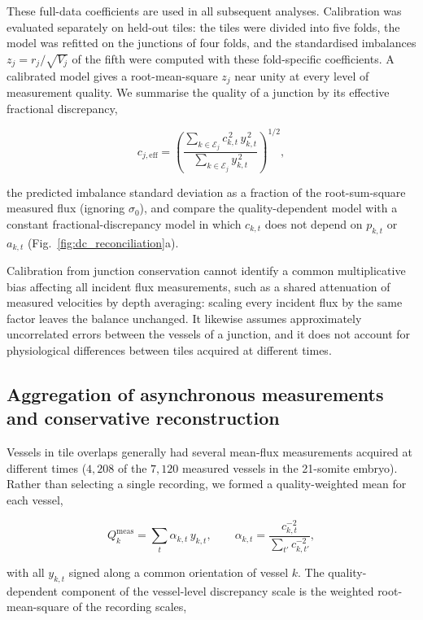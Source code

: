 These full-data coefficients are used in all subsequent analyses. Calibration was evaluated separately on held-out
tiles: the tiles were divided into five folds, the model was refitted on the junctions of four folds, and the
standardised imbalances $z_j=r_j/\sqrt{V_j}$ of the fifth were computed with these fold-specific coefficients. A calibrated
model gives a root-mean-square $z_j$ near unity at every level of measurement quality. We summarise the quality of a
junction by its effective fractional discrepancy,

\begin{equation}
c_{j,\mathrm{eff}}
=
\left(
\frac{\sum_{k\in\mathcal E_j}c_{k,t}^{\,2}\,y_{k,t}^{\,2}}
{\sum_{k\in\mathcal E_j}y_{k,t}^{\,2}}
\right)^{1/2},
\end{equation}

the predicted imbalance standard deviation as a fraction of the root-sum-square measured flux (ignoring $\sigma_0$), and
compare the quality-dependent model with a constant fractional-discrepancy model in which $c_{k,t}$ does not depend on
$p_{k,t}$ or $a_{k,t}$ (Fig.~\ref{fig:dc_reconciliation}a).

Calibration from junction conservation cannot identify a common multiplicative bias affecting all incident flux
measurements, such as a shared attenuation of measured velocities by depth averaging: scaling every incident flux by the
same factor leaves the balance unchanged. It likewise assumes approximately uncorrelated errors between the vessels of a
junction, and it does not account for physiological differences between tiles acquired at different times.

\subsection*{Aggregation of asynchronous measurements and conservative reconstruction}

Vessels in tile overlaps generally had several mean-flux measurements acquired at different times ($4{,}208$ of the
$7{,}120$ measured vessels in the 21-somite embryo). Rather than selecting a single recording, we formed a
quality-weighted mean for each vessel,

\begin{equation}
Q_k^{\mathrm{meas}}
=
\sum_t \alpha_{k,t}\,y_{k,t},
\qquad
\alpha_{k,t}=\frac{c_{k,t}^{-2}}{\sum_{t'}c_{k,t'}^{-2}},
\label{eq:measurement_aggregation}
\end{equation}

with all $y_{k,t}$ signed along a common orientation of vessel $k$. The quality-dependent component of the vessel-level
discrepancy scale is the weighted root-mean-square of the recording scales,

